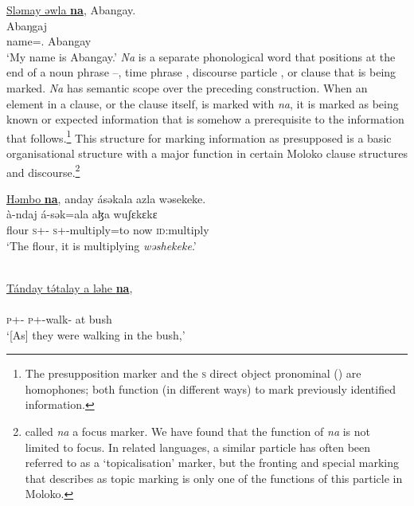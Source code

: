 \ea \label{ex:11:2}
\underline{Sləmay  əwla  \textbf{na}},  Abangay.\\
\gll {}     Abaŋgaj\\
      name={\oneS}.{\POSS} {\PSP}  Abangay\\
\glt  ‘My name is Abangay.’
\z
\largerpage[2]
\textit{Na} is a separate phonological word that positions at the end of a noun phrase --, time phrase , discourse particle , or clause  that is being marked. \textit{Na} has semantic scope over the preceding construction. When an element in a clause, or the clause itself, is marked with \textit{na}, it is marked as being known or expected information that is somehow a prerequisite to the information that follows.\footnote{The presupposition marker and the \textsc{s} direct object pronominal () are homophones; both function (in different ways) to mark previously identified information.} This structure for marking information as presupposed is a basic organisational structure with  a major function in certain Moloko clause structures and discourse.\footnote{\citet{Bow1997c} called \textit{na} a focus marker. We have found that the function of \textit{na} is not limited to focus. In related languages, a similar particle has often been referred to as a ‘topicalisation’ marker, but the fronting and special marking that \citet{Levinsohn1994} describes as topic marking is only one of the functions of this particle in Moloko.}

\ea \label{ex:11:3}
\underline{Həmbo  \textbf{na}},  anday  ásəkala  azla  wəsekeke.\\
\gll  {}   à-ndaj      á-sək=ala     aɮa   wuʃɛkɛkɛ\\
      flour  {\PSP}  \textsc{s}+{\PFV}-{\PRG}   \textsc{s}+{\IFV}-multiply=to  now    \textsc{id}:multiply\\
\glt  ‘The flour, it is multiplying \textit{wəshekeke}.’
\z

\ea \label{ex:11:4}
\\
\underline{Tánday  t\'ətalay  a  ləhe  \textbf{na}},\\  
\gll  {}    \\ 
      \textsc{p}+{\IFV}-{\PRG}  \textsc{p}+{\IFV}-walk{}-{\CL}  at  bush  {\PSP}\\
\glt ‘[As] they were walking in the bush,’\\
      
